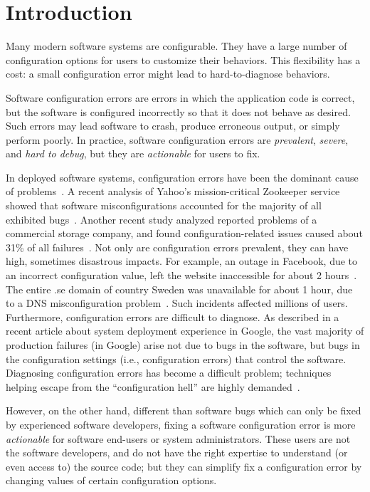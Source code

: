 \section{Introduction}
\label{sec:introduction}

Many modern software systems are configurable. They
have a large number of configuration options for users
to customize their behaviors. This flexibility has a cost:
a small configuration error might lead to hard-to-diagnose
behaviors.

Software configuration errors are errors in which
the application code is correct, but the software is
configured incorrectly so that it does not behave
as desired. Such errors may lead software to crash,
produce erroneous output, or simply perform poorly.
In practice, software configuration
errors are \textit{prevalent}, \textit{severe}, and
\textit{hard to debug}, but they are
\textit{actionable} for users
to fix.


In deployed software systems, configuration errors have been
the dominant cause of problems~\cite{}.
A recent analysis of Yahoo's mission-critical Zookeeper service
showed that software misconfigurations accounted for
the majority of all exhibited bugs~\cite{bft}. Another
recent study analyzed reported problems of a commercial
storage company, and found configuration-related issues
caused about 31\% of all failures~\cite{Yin:2011:ESC}.
Not only are configuration errors prevalent, they
can have high, sometimes disastrous impacts. For example,
an outage in Facebook, due to
an incorrect configuration value, left the website 
inaccessible for about 2 hours~\cite{fbout}. 
The entire .se domain of country Sweden was unavailable
for about 1 hour, due to a DNS misconfiguration problem~\cite{sedown}.
Such incidents affected millions of users. Furthermore, configuration
errors are difficult to diagnose.
As described in a recent article about system deployment experience
in Google, the vast majority of production failures (in Google)
arise not due to bugs in the software, but bugs in the
configuration settings (i.e., configuration errors)
that control the software. Diagnosing
configuration errors has become a difficult problem; 
techniques helping escape from the ``configuration hell''
are highly demanded~\cite{googleconf}.

However, on the other hand, different than software bugs
which can only be fixed by experienced software developers, fixing a software
configuration error is more \textit{actionable} for software end-users
or system administrators. These users are not the software developers,
and do not have the right expertise to understand (or even access to)
the source code;  but they can simplify fix a configuration error by changing
values of certain configuration options.


